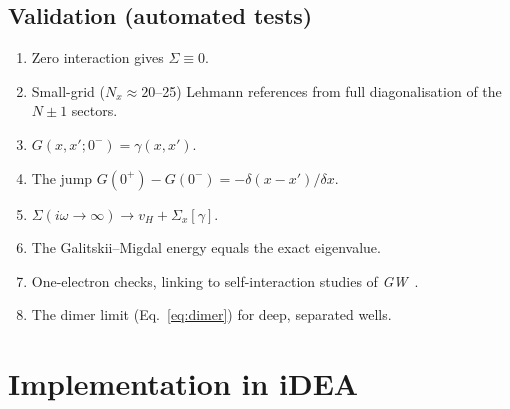 \documentclass[11pt,a4paper]{article}
\newcommand{\GW}{\textit{GW}}
\newcommand{\iDEA}{iDEA}
\begin{document}
\subsection{Validation (automated tests)}
\begin{enumerate}[label=(\roman*)]
\item Zero interaction gives $\Sigma\equiv0$.
\item Small-grid ($N_x\approx20$--25) Lehmann references from full diagonalisation of the $N\pm1$ sectors.
\item $G(x,x';0^-)=\gamma(x,x')$.
\item The jump $G(0^+)-G(0^-)=-\delta(x-x')/\delta x$.
\item $\Sigma(i\omega\to\infty)\to v_H+\Sigma_x[\gamma]$.
\item The Galitskii--Migdal energy equals the exact eigenvalue.
\item One-electron checks, linking to self-interaction studies of \GW~\cite{nelson2007,wetherell2018}.
\item The dimer limit (Eq.~\ref{eq:dimer}) for deep, separated wells.
\end{enumerate}

\section{Implementation in \iDEA}
\end{document}
